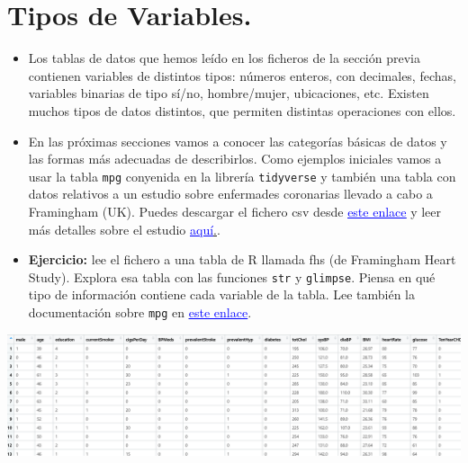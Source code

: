 \documentclass[
  9pt,
  ignorenonframetext,
]{beamer}
\begin{document}
\hypertarget{tipos-de-variables.}{%
\section{Tipos de Variables.}\label{tipos-de-variables.}}

\begin{frame}[fragile]

\begin{itemize}
\item
  Los tablas de datos que hemos leído en los ficheros de la sección
  previa contienen variables de distintos tipos: números enteros, con
  decimales, fechas, variables binarias de tipo sí/no, hombre/mujer,
  ubicaciones, etc. Existen muchos tipos de datos distintos, que
  permiten distintas operaciones con ellos.
\item
  En las próximas secciones vamos a conocer las categorías básicas de
  datos y las formas más adecuadas de describirlos. Como ejemplos
  iniciales vamos a usar la tabla \texttt{mpg} conyenida en la librería
  \texttt{tidyverse} y también una tabla con datos relativos a un
  estudio sobre enfermades coronarias llevado a cabo a Framingham (UK).
  Puedes descargar el fichero csv desde
  \href{https://raw.githubusercontent.com/fernandosansegundo/MBDFME/master/datos/framingham.csv}{\textcolor{blue}{\underline{este enlace}}}
  y leer más detalles sobre el estudio
  \href{https://biolincc.nhlbi.nih.gov/media/teachingstudies/FHS_Teaching_Longitudinal_Data_Documentation.pdf?link_time=2019-08-26_14:42:24.487245}{\textcolor{blue}{\underline{aquí}}.}.
\item
  \textbf{Ejercicio:} lee el fichero a una tabla de R llamada fhs (de
  Framingham Heart Study). Explora esa tabla con las funciones
  \texttt{str} y \texttt{glimpse}. Piensa en qué tipo de información
  contiene cada variable de la tabla. Lee también la documentación sobre
  \texttt{mpg} en
  \href{https://ggplot2.tidyverse.org/reference/mpg.html}{\textcolor{blue}{\underline{este enlace}}}.
\end{itemize}

\begin{center}\includegraphics[width=0.8\linewidth]{../fig/02-fig02-fhs} \end{center}

\end{frame}
\end{document}
